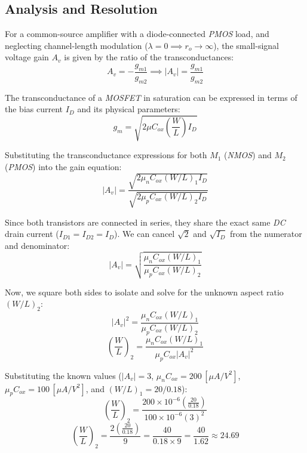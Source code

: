 \documentclass[12pt,a4paper]{article}
\begin{document}
\subsection{Analysis and Resolution}                                \label{sec_7.2}
For a common-source amplifier with a diode-connected \textit{PMOS} load, and neglecting channel-length modulation ($\lambda = 0 \implies r_{o} \to \infty$), the small-signal voltage gain $A_{v}$ is given by the ratio of the transconductances:
\begin{equation}
    A_{v} = -\frac{g_{m1}}{g_{m2}} \implies |A_{v}| = \frac{g_{m1}}{g_{m2}}
    \label{eq_56}
\end{equation}

The transconductance of a \textit{MOSFET} in saturation can be expressed in terms of the bias current $I_{D}$ and its physical parameters:
\begin{equation}
    g_{m} = \sqrt{2 \mu C_{ox} \left(\frac{W}{L}\right) I_{D}}
    \label{eq_57}
\end{equation}

Substituting the transconductance expressions for both $M_{1}$ (\textit{NMOS}) and $M_{2}$ (\textit{PMOS}) into the gain equation:
\begin{equation}
    |A_{v}| = \frac{\sqrt{2 \mu_{n} C_{ox} (W/L)_{1} I_{D}}}{\sqrt{2 \mu_{p} C_{ox} (W/L)_{2} I_{D}}}
    \label{eq_58}
\end{equation}

Since both transistors are connected in series, they share the exact same \textit{DC} drain current ($I_{D1} = I_{D2} = I_{D}$). We can cancel $\sqrt{2}$ and $\sqrt{I_{D}}$ from the numerator and denominator:
\begin{equation}
    |A_{v}| = \sqrt{\frac{\mu_{n} C_{ox} (W/L)_{1}}{\mu_{p} C_{ox} (W/L)_{2}}}
    \label{eq_59}
\end{equation}

Now, we square both sides to isolate and solve for the unknown aspect ratio $(W/L)_{2}$:
\begin{equation}
    |A_{v}|^{2} = \frac{\mu_{n} C_{ox} (W/L)_{1}}{\mu_{p} C_{ox} (W/L)_{2}}
    \label{eq_60}
\end{equation}
\begin{equation}
    \left(\frac{W}{L}\right)_{2} = \frac{\mu_{n} C_{ox} (W/L)_{1}}{\mu_{p} C_{ox} |A_{v}|^{2}}
    \label{eq_61}
\end{equation}

Substituting the known values ($|A_{v}| = 3$, $\mu_{n} C_{ox} = 200 \, [\mu A/V^{2}]$, $\mu_{p} C_{ox} = 100 \, [\mu A/V^{2}]$, and $(W/L)_{1} = 20/0.18$):
\begin{equation}
    \left(\frac{W}{L}\right)_{2} = \frac{200 \times 10^{-6} \left(\frac{20}{0.18}\right)}{100 \times 10^{-6} (3)^{2}}
    \label{eq_62}
\end{equation}
\begin{equation}
    \left(\frac{W}{L}\right)_{2} = \frac{2 \left(\frac{20}{0.18}\right)}{9} = \frac{40}{0.18 \times 9} = \frac{40}{1.62} \approx 24.69
    \label{eq_63}
\end{equation}
\end{document}

